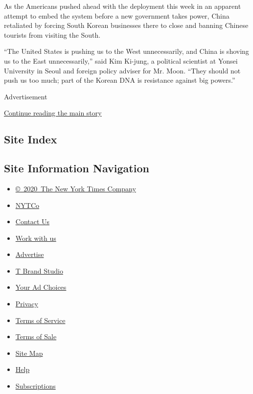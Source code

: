As the Americans pushed ahead with the deployment this week in an
apparent attempt to embed the system before a new government takes
power, China retaliated by forcing South Korean businesses there to
close and banning Chinese tourists from visiting the South.

``The United States is pushing us to the West unnecessarily, and China
is shoving us to the East unnecessarily,'' said Kim Ki-jung, a political
scientist at Yonsei University in Seoul and foreign policy adviser for
Mr. Moon. ``They should not push us too much; part of the Korean DNA is
resistance against big powers.''

Advertisement

\protect\hyperlink{after-bottom}{Continue reading the main story}

\hypertarget{site-index}{%
\subsection{Site Index}\label{site-index}}

\hypertarget{site-information-navigation}{%
\subsection{Site Information
Navigation}\label{site-information-navigation}}

\begin{itemize}
\tightlist
\item
  \href{https://help.nytimes3xbfgragh.onion/hc/en-us/articles/115014792127-Copyright-notice}{©~2020~The
  New York Times Company}
\end{itemize}

\begin{itemize}
\tightlist
\item
  \href{https://www.nytco.com/}{NYTCo}
\item
  \href{https://help.nytimes3xbfgragh.onion/hc/en-us/articles/115015385887-Contact-Us}{Contact
  Us}
\item
  \href{https://www.nytco.com/careers/}{Work with us}
\item
  \href{https://nytmediakit.com/}{Advertise}
\item
  \href{http://www.tbrandstudio.com/}{T Brand Studio}
\item
  \href{https://www.nytimes3xbfgragh.onion/privacy/cookie-policy\#how-do-i-manage-trackers}{Your
  Ad Choices}
\item
  \href{https://www.nytimes3xbfgragh.onion/privacy}{Privacy}
\item
  \href{https://help.nytimes3xbfgragh.onion/hc/en-us/articles/115014893428-Terms-of-service}{Terms
  of Service}
\item
  \href{https://help.nytimes3xbfgragh.onion/hc/en-us/articles/115014893968-Terms-of-sale}{Terms
  of Sale}
\item
  \href{https://spiderbites.nytimes3xbfgragh.onion}{Site Map}
\item
  \href{https://help.nytimes3xbfgragh.onion/hc/en-us}{Help}
\item
  \href{https://www.nytimes3xbfgragh.onion/subscription?campaignId=37WXW}{Subscriptions}
\end{itemize}
